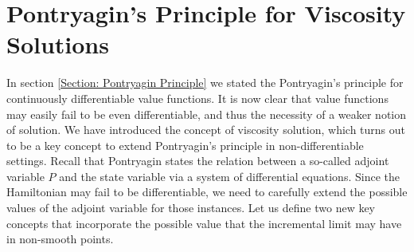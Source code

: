





    


\section{Pontryagin's Principle for Viscosity Solutions}

In section \ref{Section: Pontryagin Principle} we stated the Pontryagin's principle for continuously differentiable value functions. 
It is now clear that value functions may easily fail to be even differentiable, and thus the necessity of a weaker notion of solution. We have introduced 
the concept of viscosity solution, which turns out to be a key concept to extend Pontryagin's principle in non-differentiable settings. 
Recall that Pontryagin states the relation between a so-called adjoint variable $P$ and the state variable via a system of differential equations. Since the Hamiltonian may fail 
to be differentiable, we need to carefully extend the possible values of the adjoint variable for those instances. Let us 
define two new key concepts that incorporate the possible value that the incremental limit may have in non-smooth points. 

